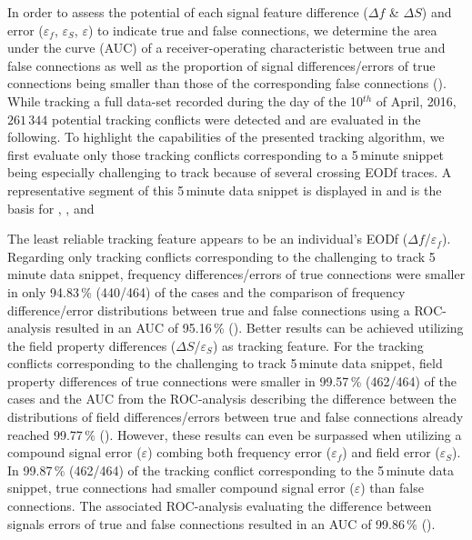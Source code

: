 In order to assess the potential of each signal feature difference ($\Delta f$ \& $\Delta S$) and error ($\varepsilon_f$, $\varepsilon_S$, $\varepsilon$) to indicate true and false connections, we determine the area under the curve (AUC) of a receiver-operating characteristic between true and false connections as well as the proportion of signal differences/errors of true connections being smaller than those of the corresponding false connections (). While tracking a full data-set recorded during the day of the 10$^{th}$ of April, 2016, $261\,344$ potential tracking conflicts were detected and are evaluated in the following. To highlight the capabilities of the presented tracking algorithm, we first evaluate only those tracking conflicts corresponding to a 5\,minute snippet being especially challenging to track because of several crossing EODf traces. A representative segment of this 5\,minute data snippet is displayed in  and is the basis for , ,  and 

The least reliable tracking feature appears to be an individual's EODf ($\Delta f$/$\varepsilon_f$). Regarding only tracking conflicts corresponding to the challenging to track 5\,minute data snippet, frequency differences/errors of true connections were smaller in only 94.83\,\% (440/464) of the cases and the comparison of frequency difference/error distributions between true and false connections using a ROC-analysis resulted in an AUC of 95.16\,\% (). Better results can be achieved utilizing the field property differences ($\Delta S$/$\varepsilon_S$) as tracking feature. For the tracking conflicts corresponding to the challenging to track 5\,minute data snippet, field property differences of true connections were smaller in 99.57\,\% (462/464) of the cases and the AUC from the ROC-analysis describing the difference between the distributions of field differences/errors between true and false connections already reached 99.77\,\% (). However, these results can even be surpassed when utilizing a compound signal error ($\varepsilon$) combing both frequency error ($\varepsilon_f$) and field error ($\varepsilon_S$). In 99.87\,\% (462/464) of the tracking conflict corresponding to the 5\,minute data snippet, true connections had smaller compound signal error ($\varepsilon$) than false connections. The associated ROC-analysis evaluating the difference between signals errors of true and false connections resulted in an AUC of 99.86\,\% (). 

